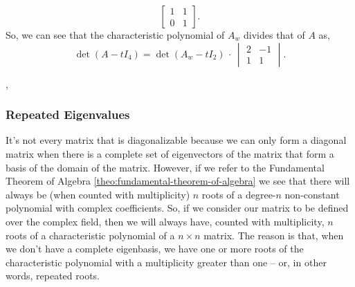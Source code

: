 \documentclass[../MathsNotesBase.tex]{subfiles}
\begin{document}
{\begin{exe}
{\[\begin{bmatrix}
						1 & 1 \\
						0 & 1
					\end{bmatrix}.
				\]
				So, we can see that the characteristic polynomial of $A_w$ divides that of $A$ as,
				\[ \det (A - tI_4) = \det (A_w - tI_2) \, \cdot \, 
														\begin{vmatrix}
															2 & -1\\
															1 & 1
														\end{vmatrix}.
				\]
			}
			\biggerskip
		\end{exe}
	
		
		\sep
		\subsubsection{Repeated Eigenvalues}
		\bigskip
		It's not every matrix that is diagonalizable because we can only form a diagonal matrix when there is a complete set of eigenvectors of the matrix that form a basis of the domain of the matrix. However, if we refer to the Fundamental Theorem of Algebra \autoref{theo:fundamental-theorem-of-algebra} we see that there will always be (when counted with multiplicity) $n$ roots of a degree-$n$ non-constant polynomial with complex coefficients. So, if we consider our matrix to be defined over the complex field, then we will always have, counted with multiplicity, $n$ roots of a characteristic polynomial of a ${ n \times n }$ matrix. The reason is that, when we don't have a complete eigenbasis, we have one or more roots of the characteristic polynomial with a multiplicity greater than one -- or, in other words, repeated roots.\\
		
}
\end{document}
